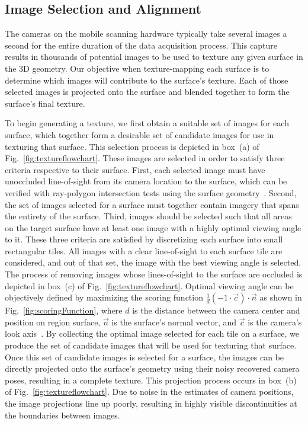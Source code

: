 \documentclass[10pt,twocolumn,twoside]{IEEEtran}
\begin{document}
\subsection{Image Selection and Alignment}
\label{ssec:image_selection}

The cameras on the mobile scanning hardware typically take several images a second for the entire duration of the data acquisition process.  This capture results in thousands of potential images to be used to texture any given surface in the 3D geometry. Our objective when texture-mapping each surface is to determine which images will contribute to the surface's texture.  Each of those selected images is projected onto the surface and blended together to form the surface's final texture.

To begin generating a texture, we first obtain a suitable set of images for each surface, which together form a desirable set of candidate images for use in texturing that surface. This selection process is depicted in box~(a) of Fig.~\ref{fig:textureflowchart}. These images are selected in order to satisfy three criteria respective to their surface. First, each selected image must have unoccluded line-of-sight from its camera location to the surface, which can be verified with ray-polygon intersection tests using the surface geometry~\cite{rayintersection}. Second, the set of images selected for a surface must together contain imagery that spans the entirety of the surface. Third, images should be selected such that all areas on the target surface have at least one image with a highly optimal viewing angle to it. These three criteria are satisfied by discretizing each surface into small rectangular tiles. All images with a clear line-of-sight to each surface tile are considered, and out of that set, the image with the best viewing angle is selected. The process of removing images whose lines-of-sight to the surface are occluded is depicted in box~(c) of Fig.~\ref{fig:textureflowchart}. Optimal viewing angle can be objectively defined by maximizing the scoring function $\frac{1}{d} (-1 \cdot \vec{c}) \cdot \vec{n}$ as shown in Fig.~\ref{fig:scoringFunction}, where $d$ is the distance between the camera center and position on region surface, $\vec{n}$ is the surface's normal vector, and $\vec{c}$ is the camera's look axis~\cite{Cheng14}. By collecting the optimal image selected for each tile on a surface, we produce the set of candidate images that will be used for texturing that surface. Once this set of candidate images is selected for a surface, the images can be directly projected onto the surface's geometry using their noisy recovered camera poses, resulting in a complete texture. This projection process occurs in box~(b) of Fig.~\ref{fig:textureflowchart}. Due to noise in the estimates of camera positions, the image projections line up poorly, resulting in highly visible discontinuities at the boundaries between images.
\end{document}
